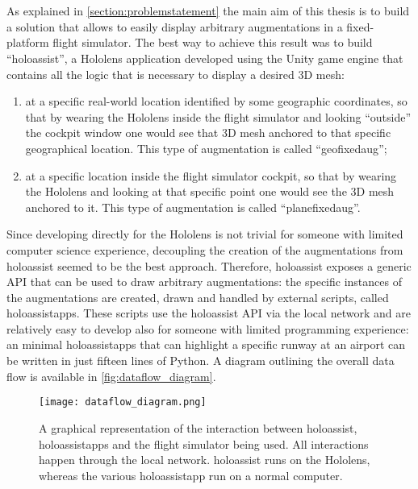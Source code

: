 
\chapter{}\label{chapter:holoassist}

As explained in \autoref{section:problemstatement} the main aim of this thesis is to build a solution that allows to easily display arbitrary augmentations in a fixed-platform flight simulator. The best way to achieve this result was to build \enquote{\gls{holoassist}}, a Hololens application developed using the Unity game engine that contains all the logic that is necessary to display a desired 3D mesh:

\begin{enumerate}
    \item at a specific real-world location identified by some geographic coordinates, so that by wearing the Hololens inside the flight simulator and looking \enquote{outside} the cockpit window one would see that 3D mesh anchored to that specific geographical location. This type of augmentation is called \enquote{\gls{geofixedaug}};
    \item at a specific location inside the flight simulator cockpit, so that by wearing the Hololens and looking at that specific point one would see the 3D mesh anchored to it. This type of augmentation is called \enquote{\gls{planefixedaug}}.
\end{enumerate}

Since developing directly for the Hololens is not trivial for someone with limited computer science experience, decoupling the creation of the augmentations from \gls{holoassist} seemed to be the best approach. Therefore, \gls{holoassist} exposes a generic \gls{API} that can be used to draw arbitrary augmentations: the specific instances of the augmentations are created, drawn and handled by external scripts, called \glspl{holoassistapp}.  These scripts use the \gls{holoassist} \gls{API} via the local network and are relatively easy to develop also for someone with limited programming experience: an minimal \glspl{holoassistapp} that can highlight a specific runway at an airport can be written in just fifteen lines of Python. A diagram outlining the overall data flow is available in \autoref{fig:dataflow_diagram}.

\begin{figure}
  \centering
  \texttt{[image: dataflow\_diagram.png]}
  \caption{A graphical representation of the interaction between \gls{holoassist}, \glspl{holoassistapp} and the flight simulator being used. All interactions happen through the local network. \gls{holoassist} runs on the Hololens, whereas the various \gls{holoassistapp} run on a normal computer.}\label{fig:dataflow_diagram}
\end{figure}

